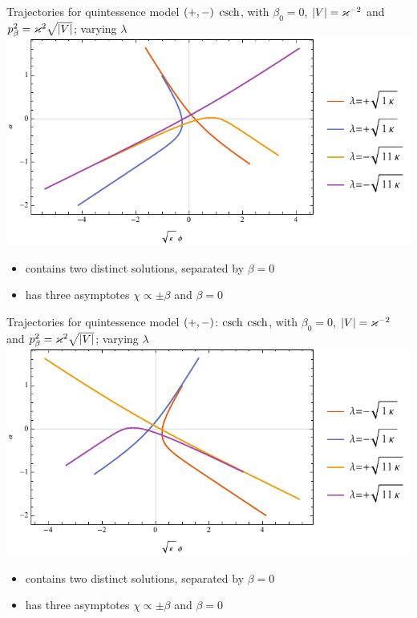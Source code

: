 \documentclass[8pt]{beamer}
\begin{document}
\begin{frame}%
{Trajectories for quintessence model ${\left(+,-\right)}$}%
{$\operatorname{csch}$, with $\beta_0 = 0$, ${\left|V\right|} = \varkappa^{-2}$ and
$p_\beta^2 = \varkappa^2\sqrt{{\left|V\right|}}$; varying $\lambda$}
\includegraphics[width=\textwidth]{../plots.nb/csch_lamb_l.pdf}
\begin{itemize}
	\item contains two distinct solutions, separated by $\beta = 0$
	\item has three asymptotes $\chi \propto \pm \beta$ and $\beta = 0$
\end{itemize}
\end{frame}

\begin{frame}%
{Trajectories for quintessence model ${\left(+,-\right)}$: $\operatorname{csch}$}%
{$\operatorname{csch}$, with $\beta_0 = 0$, ${\left|V\right|} = \varkappa^{-2}$ and
$p_\beta^2 = \varkappa^2\sqrt{{\left|V\right|}}$; varying $\lambda$}
\includegraphics[width=\textwidth]{../plots.nb/csch_lamb_r.pdf}
\begin{itemize}
	\item contains two distinct solutions, separated by $\beta = 0$
	\item has three asymptotes $\chi \propto \pm \beta$ and $\beta = 0$
\end{itemize}
\end{frame}
\end{document}
